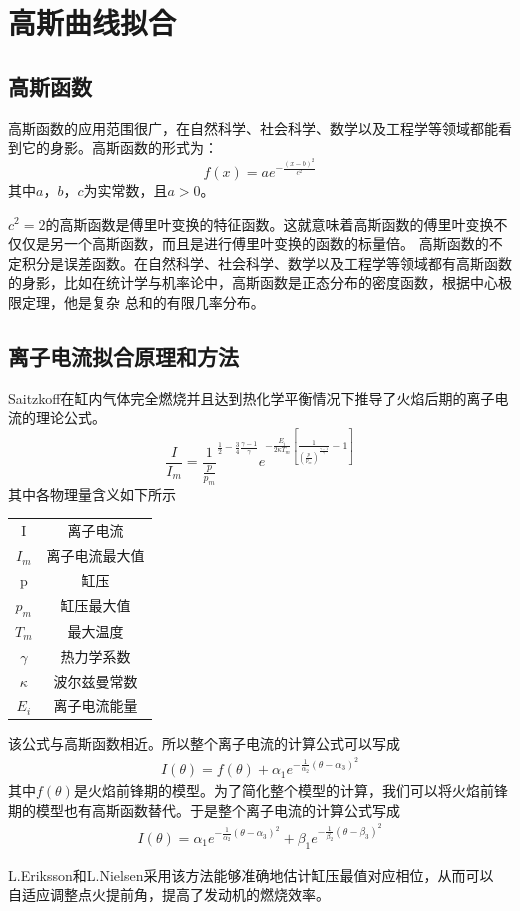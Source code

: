 \section{高斯曲线拟合}
\subsection{高斯函数}
高斯函数的应用范围很广，在自然科学、社会科学、数学以及工程学等领域都能看到它的身影。高斯函数的形式为：
\begin{equation}
	f(x)=ae^{-\frac{(x-b)^2}{c^2}}
\end{equation}
其中$a$，$b$，$c$为实常数，且$a>0$。
\par  $c^2=2$的高斯函数是傅里叶变换的特征函数。这就意味着高斯函数的傅里叶变换不仅仅是另一个高斯函数，而且是进行傅里叶变换的函数的标量倍。
高斯函数的不定积分是误差函数。在自然科学、社会科学、数学以及工程学等领域都有高斯函数的身影，比如在统计学与机率论中，高斯函数是正态分布的密度函数，根据中心极限定理，他是复杂
总和的有限几率分布。
\subsection{离子电流拟合原理和方法}
Saitzkoff\cite{saitzkoff1996ionization}在缸内气体完全燃烧并且达到热化学平衡情况下推导了火焰后期的离子电流的理论公式。
\begin{equation}
	\frac{I}{I_{m}}=\frac{1}{\frac{p}{p_m}}^{\frac{1}{2}-\frac{3}{4}\frac{\gamma -1}{\gamma}}e^{-\frac{E_i}{2\kappa T_m}[\frac{1}{(\frac{p}{p_m})^{\frac{\gamma -1}{\gamma}}}-1]}
\end{equation}
其中各物理量含义如下所示\par 
\begin{table}[H]
	\centering
	\begin{tabular}{cc}
	I&离子电流\\
	$I_m$&离子电流最大值\\
	p&缸压\\
	$p_m$&缸压最大值\\
	$T_m$&最大温度\\
	$\gamma$&热力学系数\\
	$\kappa$&波尔兹曼常数\\
	$E_i$&离子电流能量
	\end{tabular}
\end{table}
\par 该公式与高斯函数相近。所以整个离子电流的计算公式可以写成
\begin{gather}
	I(\theta)=f(\theta)+\alpha_{1}e^{-\frac{1}{\alpha_{2}}(\theta - \alpha_{3})^2} \label{eqn:interp1}
\end{gather}
其中$f(\theta)$是火焰前锋期的模型。为了简化整个模型的计算，我们可以将火焰前锋期的模型也有高斯函数替代。于是整个离子电流的计算公式写成
\begin{gather}
	I(\theta)=\alpha_{1}e^{-\frac{1}{\alpha_{2}}(\theta - \alpha_{3})^2}+\beta_{1}e^{-\frac{1}{\beta_{2}}(\theta - \beta_{3})^2}
	\label{eqn:interp2}
\end{gather}
\par
L.Eriksson和L.Nielsen\cite{eriksson1996ignition,eriksson1997closed,eriksson1997ionization}采用该方法能够准确地估计缸压最值对应相位，从而可以
自适应调整点火提前角，提高了发动机的燃烧效率。
